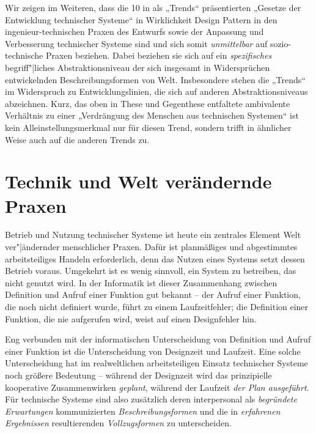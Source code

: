 \documentclass[11pt,a4paper]{article}
\begin{document}
Wir zeigen im Weiteren, dass die 10 in \cite{TESE2018} als „Trends“
präsentierten „Gesetze der Entwicklung technischer Systeme“ in Wirklichkeit
Design Pattern in den ingenieur-technischen Praxen des Entwurfs sowie der
Anpassung und Verbesserung technischer Systeme sind und sich somit
\emph{unmittelbar} auf sozio-technische Praxen beziehen. Dabei beziehen sie
sich auf ein \emph{spezifisches} begriff"|liches Abstraktionsniveau der sich
insgesamt in Widersprüchen entwickelnden Beschreibungsformen von
Welt. Insbesondere stehen die „Trends“ im Widerspruch zu Entwicklungslinien,
die sich auf anderen Abstraktionsniveaus abzeichnen. Kurz, das oben in These
und Gegenthese entfaltete ambivalente Verhältnis zu einer „Verdrängung des
Menschen aus technischen Systemen“ ist kein Alleinstellungsmerkmal nur für
diesen Trend, sondern trifft in ähnlicher Weise auch auf die anderen Trends
zu.

\section{Technik und Welt verändernde Praxen}

Betrieb und Nutzung technischer Systeme ist heute ein zentrales Element Welt
ver"|ändernder menschlicher Praxen. Dafür ist planmäßiges und abgestimmtes
arbeitsteiliges Handeln erforderlich, denn das Nutzen eines Systems setzt
dessen Betrieb voraus.  Umgekehrt ist es wenig sinnvoll, ein System zu
betreiben, das nicht genutzt wird. In der Informatik ist dieser Zusammenhang
zwischen Definition und Aufruf einer Funktion gut bekannt -- der Aufruf einer
Funktion, die noch nicht definiert wurde, führt zu einem Laufzeitfehler; die
Definition einer Funktion, die nie aufgerufen wird, weist auf einen
Designfehler hin.

Eng verbunden mit der informatischen Unterscheidung von Definition und Aufruf
einer Funktion ist die Unterscheidung von Designzeit und Laufzeit.  Eine
solche Unterscheidung hat im realweltlichen arbeitsteiligen Einsatz
technischer Systeme noch größere Bedeutung -- während der Designzeit wird das
prinzipielle kooperative Zusammenwirken \emph{geplant}, während der Laufzeit
\emph{der Plan ausgeführt}. Für technische Systeme sind also zusätzlich deren
interpersonal als \emph{begründete Erwartungen} kommunizierten
\emph{Beschreibungsformen} und die in \emph{erfahrenen Ergebnissen}
resultierenden \emph{Vollzugsformen} zu unterscheiden.
\end{document}

